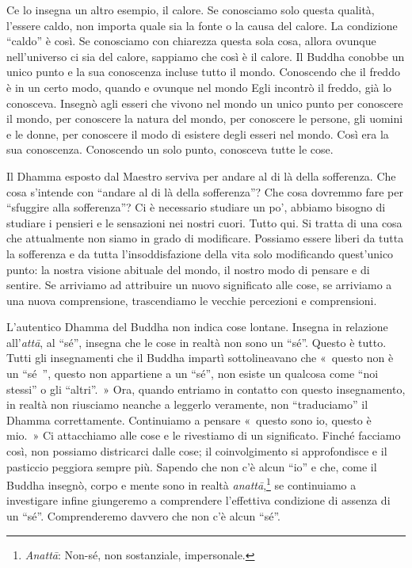 Ce lo insegna un altro esempio, il calore. Se conosciamo solo questa
qualità, l'essere caldo, non importa quale sia la fonte o la causa del
calore. La condizione ``caldo'' è così. Se conosciamo con chiarezza
questa sola cosa, allora ovunque nell'universo ci sia del calore,
sappiamo che così è il calore. Il Buddha conobbe un unico punto e la sua
conoscenza incluse tutto il mondo. Conoscendo che il freddo è in un
certo modo, quando e ovunque nel mondo Egli incontrò il freddo, già lo
conosceva. Insegnò agli esseri che vivono nel mondo un unico punto per
conoscere il mondo, per conoscere la natura del mondo, per conoscere le
persone, gli uomini e le donne, per conoscere il modo di esistere degli
esseri nel mondo. Così era la sua conoscenza. Conoscendo un solo punto,
conosceva tutte le cose.

Il Dhamma esposto dal Maestro serviva per andare al di là della
sofferenza. Che cosa s'intende con ``andare al di là della sofferenza''?
Che cosa dovremmo fare per ``sfuggire alla sofferenza''? Ci è necessario
studiare un po', abbiamo bisogno di studiare i pensieri e le sensazioni
nei nostri cuori. Tutto qui. Si tratta di una cosa che attualmente non
siamo in grado di modificare. Possiamo essere liberi da tutta la
sofferenza e da tutta l'insoddisfazione della vita solo modificando
quest'unico punto: la nostra visione abituale del mondo, il nostro modo
di pensare e di sentire. Se arriviamo ad attribuire un nuovo significato
alle cose, se arriviamo a una nuova comprensione, trascendiamo le
vecchie percezioni e comprensioni.

L'autentico Dhamma del Buddha non indica cose lontane. Insegna in
relazione all'\emph{attā}, al ``sé'', insegna che le cose in realtà non
sono un ``sé''. Questo è tutto. Tutti gli insegnamenti che il Buddha
impartì sottolineavano che «~questo non è un ``sé~'', questo non
appartiene a un ``sé'', non esiste un qualcosa come ``noi stessi'' o gli
``altri''.~» Ora, quando entriamo in contatto con questo insegnamento,
in realtà non riusciamo neanche a leggerlo veramente, non ``traduciamo''
il Dhamma correttamente. Continuiamo a pensare «~questo sono io, questo
è mio.~» Ci attacchiamo alle cose e le rivestiamo di un significato.
Finché facciamo così, non possiamo districarci dalle cose; il
coinvolgimento si approfondisce e il pasticcio peggiora sempre più.
Sapendo che non c'è alcun ``io'' e che, come il Buddha insegnò, corpo e
mente sono in realtà \emph{anattā},\footnote{\emph{Anattā}: Non-sé, non
  sostanziale, impersonale.} se continuiamo a investigare infine
giungeremo a comprendere l'effettiva condizione di assenza di un ``sé''.
Comprenderemo davvero che non c'è alcun ``sé''.

